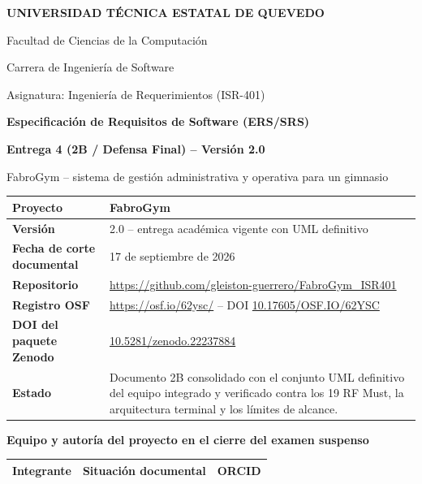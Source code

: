 \documentclass[11pt,a4paper,twoside]{article}
\newcommand{\zenododoi}{\href{https://doi.org/10.5281/zenodo.22237884}{10.5281/zenodo.22237884}}
\begin{document}
\begin{titlepage}
\centering
{\Large\bfseries UNIVERSIDAD TÉCNICA ESTATAL DE QUEVEDO\par}
\vspace{0.25cm}
{\large Facultad de Ciencias de la Computación\par}
{\large Carrera de Ingeniería de Software\par}
\vspace{0.45cm}
{\large Asignatura: Ingeniería de Requerimientos (ISR-401)\par}
\vspace{0.55cm}
{\LARGE\bfseries Especificación de Requisitos de Software (ERS/SRS)\par}
\vspace{0.25cm}
{\Large\bfseries Entrega 4 (2B / Defensa Final) -- Versión 2.0\par}
\vspace{0.18cm}
{\large FabroGym -- sistema de gestión administrativa y operativa para un gimnasio\par}
\vspace{0.5cm}
\begin{tabularx}{\textwidth}{|>{\bfseries}p{4.0cm}|X|}\hline
Proyecto & FabroGym \\\hline
Versión & 2.0 -- entrega académica vigente con UML definitivo \\\hline
Fecha de corte documental & 17 de septiembre de 2026 \\\hline
Repositorio & \url{https://github.com/gleiston-guerrero/FabroGym_ISR401} \\\hline
Registro OSF & \url{https://osf.io/62ysc/} -- DOI \href{https://doi.org/10.17605/OSF.IO/62YSC}{10.17605/OSF.IO/62YSC} \\\hline
DOI del paquete Zenodo & \zenododoi \\\hline
Estado & Documento 2B consolidado con el conjunto UML definitivo del equipo integrado y verificado contra los 19 RF Must, la arquitectura terminal y los límites de alcance. \\\hline
\end{tabularx}
\vspace{0.35cm}
{\normalsize\bfseries Equipo y autoría del proyecto en el cierre del examen suspenso\par}
\vspace{0.1cm}
\small
\begin{tabularx}{\textwidth}{|X|X|p{4.15cm}|}\hline
\textbf{Integrante} & \textbf{Situación documental} & \textbf{ORCID}\\\hline

\end{tabularx}
\end{titlepage}
\end{document}
